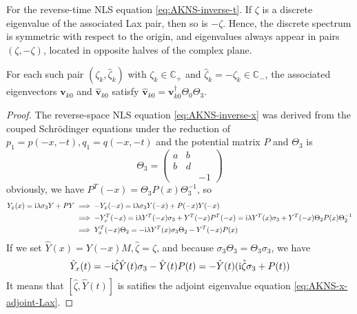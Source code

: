 \begin{theorem}
    For the reverse-time NLS equation \eqref{eq:AKNS-inverse-t}. If $\zeta$ is a discrete eigenvalue of the associated Lax pair, then so is $-\zeta$. Hence, the discrete spectrum is symmetric with respect to the origin, and eigenvalues always appear in pairs $(\zeta, -\zeta)$, located in opposite halves of the complex plane.
    
    For each such pair $(\zeta_k, \hat{\zeta}_k)$ with $\zeta_k \in \mathbb{C}_+$ and $\hat{\zeta}_k = -\zeta_k \in \mathbb{C}_-$, the associated eigenvectors $\mathbf{v}_{k0}$ and $\hat{\mathbf{v}}_{k0}$ satisfy $ \hat{\mathbf{v}}_{k0} = \mathbf{v}_{k0}^{\dagger}\Theta_{0}\Theta_{3}  $.
\end{theorem}

\begin{proof}
    The reverse-space NLS equation \eqref{eq:AKNS-inverse-x} was derived from the couped Schrödinger equations under the reduction of $p_{1} = p(-x,-t), q_{1} = q(-x,-t) $ and the potential matrix $ P $ and $\Theta_3$ is 
    \begin{equation}
        \Theta_{3} = \begin{pmatrix}
            a & b & \\ b & d &  \\ &  & -1 
        \end{pmatrix}
    \end{equation}
    obviously, we have $ P^{T}(-x) = \Theta_{3} P(x) \Theta_{3}^{-1} $, so 
    \begin{equation}
        \begin{aligned}
            Y_{x}(x) = \mathrm{i} \lambda \sigma_{3} Y + PY &\implies  -Y_{x}(-x) = \mathrm{i} \lambda \sigma_{3} Y(-x) + P(-x)Y(-x) \\
             &\implies -Y_{x}^{T}(-x) = \mathrm{i} \lambda Y^{T}(-x) \sigma_{3} + Y^{T}(-x) P^{T}(-x) = \mathrm{i} \lambda Y^{T}(x) \sigma_{3} + Y^{T}(-x) \Theta_{2} P(x) \Theta_{2}^{-1} \\
             &\implies Y_{x}^{T}(-x) \Theta_{2} = -\mathrm{i} \lambda Y^{T}(x) \sigma_{3} \Theta_{2} - Y^{T}(-x) P(x) 
         \end{aligned}
    \end{equation}
    If we set $ \hat{Y}(x) = Y(-x)M, \hat{\zeta} = \zeta $, and because $ \sigma_{3}\Theta_{3} = \Theta_{3} \sigma_{3} $, we have
    \begin{equation}
        \hat{Y}_{x}(t) = -\mathrm{i} \hat{\zeta} \hat{Y}(t) \sigma_{3} - \hat{Y}(t) P(t) = -\hat{Y}(t)(\mathrm{i} \hat{\zeta}\sigma_{3} + P(t))
    \end{equation}
    It means that $ [\hat{\zeta}, \hat{Y}(t)] $ is satifies the adjoint eigenvalue equation \eqref{eq:AKNS-x-adjoint-Lax}.


\end{proof}
